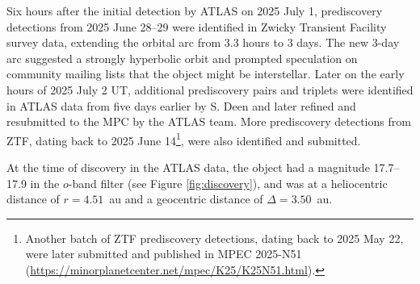 \documentclass[linenumbers,twocolumn,longbib]{aastex7}
\begin{document}
Six hours after the initial detection by ATLAS on 2025 July 1, prediscovery detections from 2025 June 28--29 were identified in Zwicky Transient Facility \citep[ZTF;][]{bellm2019_ztf, 2019PASP..131g8001G} survey data, extending the orbital arc from 3.3 hours to 3 days. The new 3-day arc suggested a strongly hyperbolic orbit and prompted speculation on community mailing lists that the object might be interstellar. Later on the early hours of 2025 July 2 UT, additional prediscovery pairs and triplets were identified in ATLAS data from five days earlier by S. Deen and later refined and resubmitted to the MPC by the ATLAS team. More prediscovery detections from ZTF, dating back to 2025 June 14\footnote{Another batch of ZTF prediscovery detections, dating back to 2025 May 22, were later submitted and published in MPEC 2025-N51 (\url{https://minorplanetcenter.net/mpec/K25/K25N51.html}).}, were also identified and submitted.

At the time of discovery in the ATLAS data, the object had a magnitude 17.7--17.9 in the $o$-band filter (see Figure \ref{fig:discovery}), and was at a heliocentric distance of $r=4.51$~au and a geocentric distance of $\Delta=3.50$~au.
\end{document}
